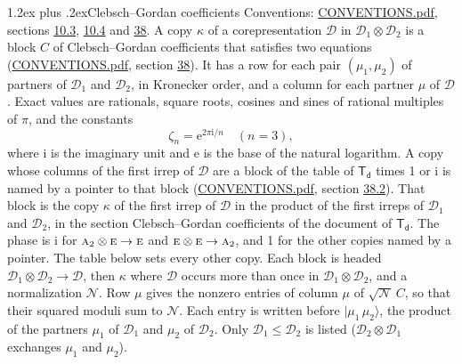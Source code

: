 \documentclass[10pt,a4paper]{article}
\makeatletter
\renewcommand\section{\@startsection{section}{1}{\z@}{-3ex plus -1ex minus -.2ex}%
  {1.2ex plus .2ex}{\normalfont\large\sffamily\bfseries\color{parttitle}}}
\numberwithin{equation}{section}
\newcommand{\grp}[1]{\mathsf{#1}}
\newcommand{\irr}[1]{\text{\normalfont\scshape #1}}
\newcommand{\iunit}{\mathrm{i}}
\newcommand{\expe}{\mathrm{e}}
\newcommand{\rootunity}[1]{\zeta_{#1}}
\newcommand{\irrprod}{\otimes}
\newcommand{\mult}{\kappa}
\newcommand{\intx}{\mu}
\newcommand{\cgnorm}{\mathcal{N}}
\newcommand{\prodket}[2]{\lvert {#1}\,{#2}\rangle}
\makeatother
\begin{document}
\section{Clebsch--Gordan coefficients}\label{s:clebsch_gordan}
Conventions: \href{../../CONVENTIONS.pdf}{CONVENTIONS.pdf}, sections \href{../../../rotation/CONVENTIONS.pdf\#conv.10.3}{10.3}, \href{../../../rotation/CONVENTIONS.pdf\#conv.10.4}{10.4} and \href{../../CONVENTIONS.pdf\#conv.38}{38}.
\leavevmode\label{n:index.copy}\label{n:matrix.cg.stored}A copy $\mult$ of a corepresentation $\mathcal{D}$ in $\mathcal{D}_1\irrprod\mathcal{D}_2$ is a block $C$ of Clebsch--Gordan coefficients that satisfies two equations (\href{../../CONVENTIONS.pdf}{CONVENTIONS.pdf}, section \href{../../CONVENTIONS.pdf\#conv.38}{38}). \label{n:index.cg}It has a row for each pair $(\intx_1, \intx_2)$ of partners of $\mathcal{D}_1$ and $\mathcal{D}_2$, in Kronecker order, and a column for each partner $\intx$ of $\mathcal{D}$.
\leavevmode\label{n:constant.root}\label{n:index.root.order}Exact values are rationals, square roots, cosines and sines of rational multiples of $\pi$, and the constants
\begin{equation}\label{e:constants}\rootunity{n} = \expe^{2\pi\iunit/n}\quad(n = 3),\end{equation}
where $\iunit$ is the imaginary unit and $\expe$ is the base of the natural logarithm.
A copy whose columns of the first irrep of $\mathcal{D}$ are a block of the table of $\grp{T_{d}}$ times 1 or $\iunit$ is named by a pointer to that block (\href{../../CONVENTIONS.pdf}{CONVENTIONS.pdf}, section \href{../../CONVENTIONS.pdf\#conv.38.2}{38.2}). That block is the copy $\mult$ of the first irrep of $\mathcal{D}$ in the product of the first irreps of $\mathcal{D}_1$ and $\mathcal{D}_2$, in the section Clebsch--Gordan coefficients of the document of \href{../../../rotation/data/pdf/Td.pdf}{$\grp{T_{d}}$}. The phase is $\iunit$ for $\irr{a}_{2}\irrprod \irr{e}\to \irr{e}$ and $\irr{e}\irrprod \irr{e}\to \irr{a}_{2}$, and 1 for the other copies named by a pointer. The table below sets every other copy.
Each block is headed $\mathcal{D}_1\irrprod\mathcal{D}_2\to\mathcal{D}$, then $\mult$ where $\mathcal{D}$ occurs more than once in $\mathcal{D}_1\irrprod\mathcal{D}_2$, and a normalization $\cgnorm$. Row $\intx$ gives the nonzero entries of column $\intx$ of $\sqrt{\cgnorm}\,C$, so that their squared moduli sum to $\cgnorm$. \label{n:vector.ket.product}Each entry is written before $\prodket{\intx_1}{\intx_2}$, the product of the partners $\intx_1$ of $\mathcal{D}_1$ and $\intx_2$ of $\mathcal{D}_2$. Only $\mathcal{D}_1 \le \mathcal{D}_2$ is listed ($\mathcal{D}_2\irrprod\mathcal{D}_1$ exchanges $\intx_1$ and $\intx_2$).
\end{document}
